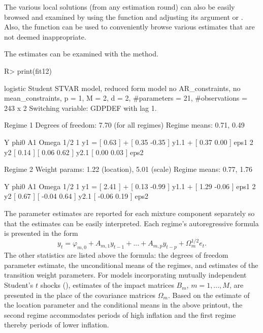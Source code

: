 \documentclass[nojss]{jss}
\begin{document}
The various local solutions (from any estimation round) can also be easily browsed and examined by using the function  and adjusting its argument  or . Also, the function  can be used to conveniently
browse various estimates that are not deemed inappropriate.

The estimates can be examined with the  method.
%
\begin{CodeChunk}
\begin{CodeInput}
R> print(fit12)
\end{CodeInput}
\begin{CodeOutput}
logistic Student STVAR model, reduced form model no AR_constraints,
no mean_constraints,
  p = 1, M = 2, d = 2, #parameters = 21, #observations = 243 x 2
  Switching variable: GDPDEF with lag 1.

Regime 1
Degrees of freedom: 7.70 (for all regimes)
Regime means: 0.71, 0.49

   Y     phi0          A1                  Omega        1/2
1 y1 = [ 0.63 ] + [  0.35 -0.35 ] y1.1 + [  0.37 0.00 ]     eps1
2 y2   [ 0.14 ]   [  0.06  0.62 ] y2.1   [  0.00 0.03 ]     eps2

Regime 2
Weight params: 1.22 (location), 5.01 (scale)
Regime means: 0.77, 1.76

   Y     phi0          A1                  Omega         1/2
1 y1 = [ 2.41 ] + [  0.13 -0.99 ] y1.1 + [  1.29 -0.06 ]     eps1
2 y2   [ 0.67 ]   [ -0.04  0.64 ] y2.1   [ -0.06  0.19 ]     eps2
\end{CodeOutput}
\end{CodeChunk}
%
The parameter estimates are reported for each mixture component separately so that the estimates can be easily interpreted. Each regime's autoregressive formula is presented in the form
\begin{equation}
y_t = \varphi_{m,0} + A_{m,1}y_{t - 1} + ... + A_{m,p}y_{t - p} + \Omega_{m}^{1/2}e_{t}.
\end{equation}
The other statistics are listed above the formula: the degrees of freedom parameter estimate, the unconditional means of the regimes, and estimates of the transition weight parameters. For models incorporating mutually independent Student's $t$ shocks (), estimates of the impact matrices $B_m$, $m=1,...,M$, are presented in the place of the covariance matrices $\Omega_{m}$. Based on the estimate of the location parameter and the conditional means in the above printout, the second regime accommodates periods of high inflation and the first regime thereby periods of lower inflation.
\end{document}
